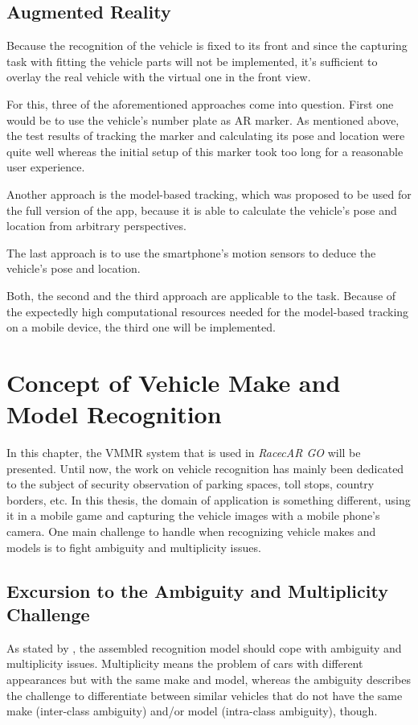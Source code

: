 \subsection{Augmented Reality}
Because the recognition of the vehicle is fixed to its front and since the capturing task with fitting the vehicle parts will not be implemented, it's sufficient to overlay the real vehicle with the virtual one in the front view.

For this, three of the aforementioned approaches come into question. First one would be to use the vehicle's number plate as AR marker. As mentioned above, the test results of tracking the marker and calculating its pose and location were quite well whereas the initial setup of this marker took too long for a reasonable user experience.

Another approach is the model-based tracking, which was proposed to be used for the full version of the app, because it is able to calculate the vehicle's pose and location from arbitrary perspectives.

The last approach is to use the smartphone's motion sensors to deduce the vehicle's pose and location.

Both, the second and the third approach are applicable to the task. Because of the expectedly high computational resources needed for the model-based tracking on a mobile device, the third one will be implemented.


\section{Concept of Vehicle Make and Model Recognition}\label{sec:vmmrConcept}
In this chapter, the VMMR system that is used in \emph{RacecAR GO} will be presented. Until now, the work on vehicle recognition has mainly been dedicated to the subject of security observation of parking spaces, toll stops, country borders, etc. In this thesis, the domain of application is something different, using it in a mobile game and capturing the vehicle images with a mobile phone's camera. One main challenge to handle when recognizing vehicle makes and models is to fight ambiguity and multiplicity issues.

\subsection{Excursion to the Ambiguity and Multiplicity Challenge}\label{sec:excursionAmbiguity}
As stated by \citep{siddiqui2015robust}, the assembled recognition model should cope with ambiguity and multiplicity issues. Multiplicity means the problem of cars with different appearances but with the same make and model, whereas the ambiguity describes the challenge to differentiate between similar vehicles that do not have the same make (inter-class ambiguity) and/or model (intra-class ambiguity), though.

